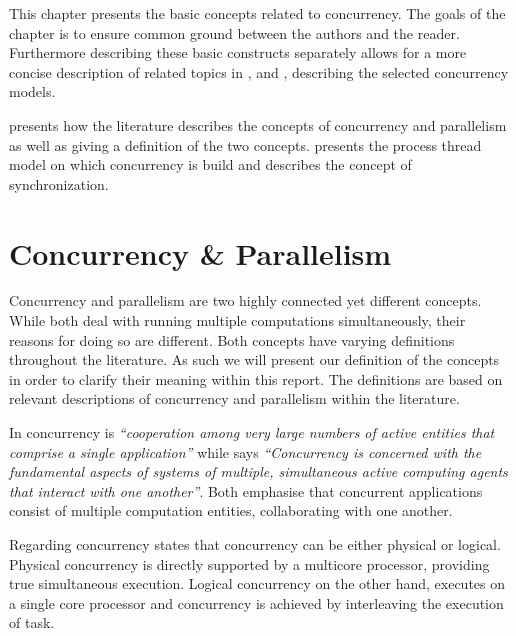 \makeatletter {}\makeatother
{}
This chapter presents the basic concepts related to concurrency. The goals of the chapter is to ensure common ground between the authors and the reader. Furthermore describing these basic constructs separately allows for a more concise description of related topics in ,  and , describing the selected concurrency models. 
\label{chp:con_basics}

 presents how the literature describes the concepts of concurrency and parallelism as well as giving a definition of the two concepts.  presents the process thread model on which concurrency is build and  describes the concept of synchronization.
\section{Concurrency \& Parallelism}\label{sec:concurrency_parallelism}
Concurrency and parallelism are two highly connected yet different concepts. While both deal with running multiple computations simultaneously, their reasons for doing so are different. Both concepts have varying definitions throughout the literature. As such we will present our definition of the concepts in order to clarify their meaning within this report. The definitions are based on relevant descriptions of concurrency and parallelism within the literature.

In \cite[p. 330]{papadopoulos1998coordination} concurrency is \textit{``cooperation among very large numbers of active entities that comprise a single application''} while \cite[p. 607]{cleaveland1996strategic}
says \textit{``Concurrency is concerned with the fundamental aspects of systems of multiple, simultaneous active computing agents that interact with one another''}. Both emphasise that concurrent applications consist of multiple computation entities, collaborating with one another.

Regarding concurrency \cite[p. 579]{sebestaProLang} states that concurrency can be either physical or logical. Physical concurrency is directly supported by a multicore processor, providing true simultaneous execution. Logical concurrency on the other hand, executes on a single core processor and concurrency is achieved by interleaving the execution of task.

